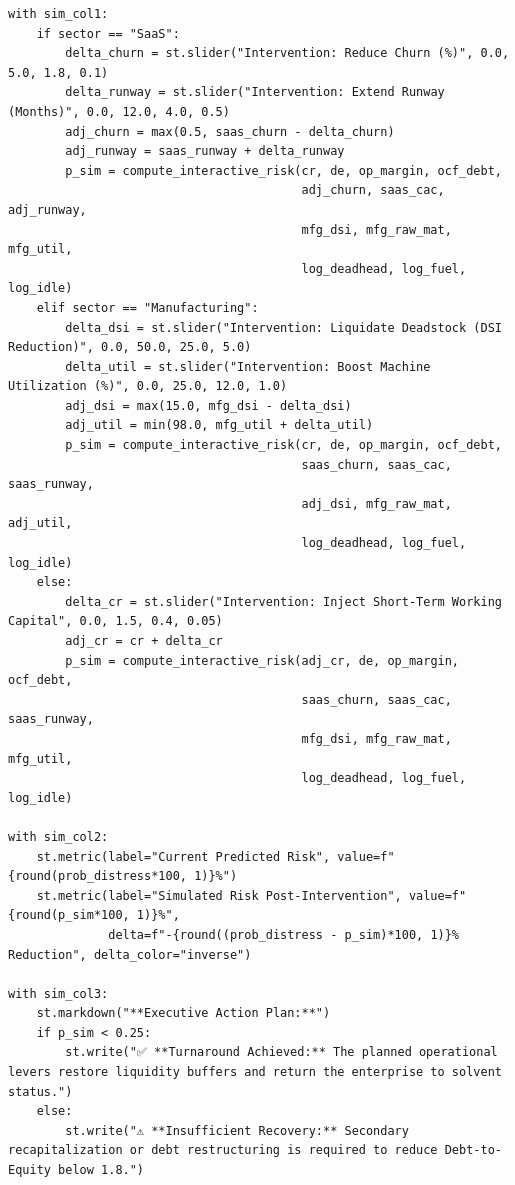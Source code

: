 \documentclass[11pt, a4paper]{article}
\begin{document}
\begin{verbatim}
with sim_col1:
    if sector == "SaaS":
        delta_churn = st.slider("Intervention: Reduce Churn (%)", 0.0, 5.0, 1.8, 0.1)
        delta_runway = st.slider("Intervention: Extend Runway (Months)", 0.0, 12.0, 4.0, 0.5)
        adj_churn = max(0.5, saas_churn - delta_churn)
        adj_runway = saas_runway + delta_runway
        p_sim = compute_interactive_risk(cr, de, op_margin, ocf_debt, 
                                         adj_churn, saas_cac, adj_runway,
                                         mfg_dsi, mfg_raw_mat, mfg_util,
                                         log_deadhead, log_fuel, log_idle)
    elif sector == "Manufacturing":
        delta_dsi = st.slider("Intervention: Liquidate Deadstock (DSI Reduction)", 0.0, 50.0, 25.0, 5.0)
        delta_util = st.slider("Intervention: Boost Machine Utilization (%)", 0.0, 25.0, 12.0, 1.0)
        adj_dsi = max(15.0, mfg_dsi - delta_dsi)
        adj_util = min(98.0, mfg_util + delta_util)
        p_sim = compute_interactive_risk(cr, de, op_margin, ocf_debt, 
                                         saas_churn, saas_cac, saas_runway,
                                         adj_dsi, mfg_raw_mat, adj_util,
                                         log_deadhead, log_fuel, log_idle)
    else:
        delta_cr = st.slider("Intervention: Inject Short-Term Working Capital", 0.0, 1.5, 0.4, 0.05)
        adj_cr = cr + delta_cr
        p_sim = compute_interactive_risk(adj_cr, de, op_margin, ocf_debt, 
                                         saas_churn, saas_cac, saas_runway,
                                         mfg_dsi, mfg_raw_mat, mfg_util,
                                         log_deadhead, log_fuel, log_idle)

with sim_col2:
    st.metric(label="Current Predicted Risk", value=f"{round(prob_distress*100, 1)}%")
    st.metric(label="Simulated Risk Post-Intervention", value=f"{round(p_sim*100, 1)}%", 
              delta=f"-{round((prob_distress - p_sim)*100, 1)}% Reduction", delta_color="inverse")

with sim_col3:
    st.markdown("**Executive Action Plan:**")
    if p_sim < 0.25:
        st.write("✅ **Turnaround Achieved:** The planned operational levers restore liquidity buffers and return the enterprise to solvent status.")
    else:
        st.write("⚠️ **Insufficient Recovery:** Secondary recapitalization or debt restructuring is required to reduce Debt-to-Equity below 1.8.")
\end{verbatim}

\clearpage
\end{document}
